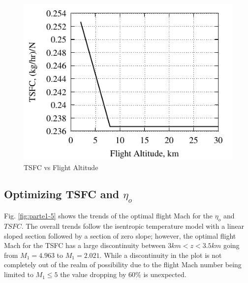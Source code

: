\documentclass[conf]{new-aiaa} %
\begin{document}
\begin{figure}[H] %
    \centering
    \includegraphics[]{media/performance_parameter_files/part_d_TSFC.pdf}
    \caption{\label{fig:partdtsfc}TSFC vs Flight Altitude}
\end{figure}

\subsection{Optimizing TSFC and \texorpdfstring{$\eta_o$}{eta\_o}} %
Fig. \ref{fig:parte1-5} shows the trends of the optimal flight Mach for the $\eta_o$ and $TSFC$. The overall trends follow the isentropic temperature model with a linear sloped section followed by a section of zero slope; however, the optimal flight Mach for the TSFC has a large discontinuity between $3km<z<3.5km$ going from $M_1=4.963$ to $M_1=2.021$. While a discontinuity in the plot is not completely out of the realm of possibility due to the flight Mach number being limited to $M_1\leq5$ the value dropping by 60\% is unexpected.
\end{document}
